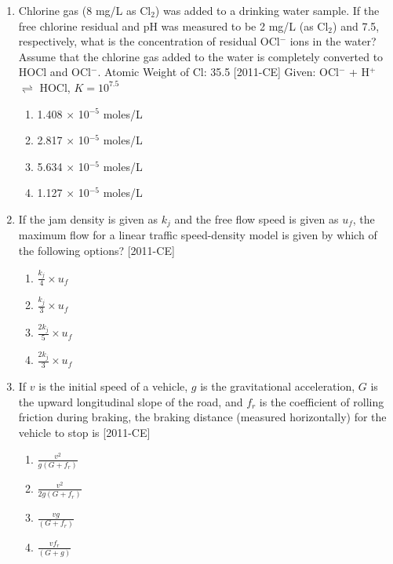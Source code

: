 \documentclass[journal,12pt,onecolumn]{IEEEtran}
\theoremstyle{remark}
\begin{document}
\begin{enumerate}
    \item Chlorine gas (8 mg/L as Cl$_2$) was added to a drinking water sample. If the free chlorine residual and pH was measured to be 2 mg/L (as Cl$_2$) and 7.5, respectively, what is the concentration of residual OCl$^-$ ions in the water? Assume that the chlorine gas added to the water is completely converted to HOCl and OCl$^-$. Atomic Weight of Cl: 35.5 \hfill{[2011-CE]}
    Given: OCl$^-$ + H$^+$ $\rightleftharpoons$ HOCl,   $K = 10^{7.5}$
    \begin{enumerate}
        \item 1.408 $\times$ 10$^{-5}$ moles/L
        \item 2.817 $\times$ 10$^{-5}$ moles/L
        \item 5.634 $\times$ 10$^{-5}$ moles/L
        \item 1.127 $\times$ 10$^{-5}$ moles/L
    \end{enumerate}

    \item If the jam density is given as $k_j$ and the free flow speed is given as $u_f$, the maximum flow for a linear traffic speed-density model is given by which of the following options? \hfill{[2011-CE]}
    \begin{enumerate}
        \item $\frac{k_j}{4} \times u_f$
        \item $\frac{k_j}{3} \times u_f$
        \item $\frac{2k_j}{5} \times u_f$
        \item $\frac{2k_j}{3} \times u_f$
    \end{enumerate}

    \item If $v$ is the initial speed of a vehicle, $g$ is the gravitational acceleration, $G$ is the upward longitudinal slope of the road, and $f_r$ is the coefficient of rolling friction during braking, the braking distance (measured horizontally) for the vehicle to stop is \hfill{[2011-CE]}

    \begin{enumerate}
        \item $\frac{v^2}{g(G + f_r)}$
        \item $\frac{v^2}{2g(G + f_r)}$
        \item $\frac{vg}{(G + f_r)}$
        \item $\frac{vf_r}{(G + g)}$
    \end{enumerate}


\end{enumerate}
\end{document}
